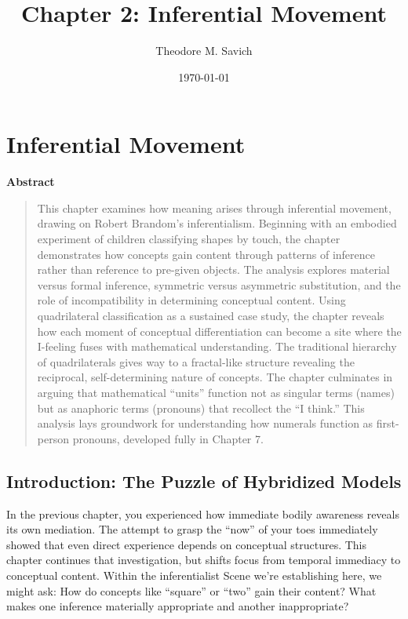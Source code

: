 \documentclass[12pt]{book}
\title{Chapter 2: Inferential Movement}
\author{Theodore M. Savich}
\date{\today}
\newenvironment{abstract}
    { %
      \begin{center} %
        \textbf{Abstract} %
      \end{center}
      \vspace{\baselineskip} %
      \begin{quotation} %
      \small %
    }
    { %
      \end{quotation} %
      \bigskip %
    }
\begin{document}
\maketitle

\chapter{Inferential Movement}\label{inferential-movement}

\begin{abstract}
  

This chapter examines how meaning arises through inferential movement, drawing on Robert Brandom's inferentialism. Beginning with an embodied experiment of children classifying shapes by touch, the chapter demonstrates how concepts gain content through patterns of inference rather than reference to pre-given objects. The analysis explores material versus formal inference, symmetric versus asymmetric substitution, and the role of incompatibility in determining conceptual content. Using quadrilateral classification as a sustained case study, the chapter reveals how each moment of conceptual differentiation can become a site where the I-feeling fuses with mathematical understanding. The traditional hierarchy of quadrilaterals gives way to a fractal-like structure revealing the reciprocal, self-determining nature of concepts. The chapter culminates in arguing that mathematical ``units'' function not as singular terms (names) but as anaphoric terms (pronouns) that recollect the ``I think.'' This analysis lays groundwork for understanding how numerals function as first-person pronouns, developed fully in Chapter 7.

\end{abstract}


\section{Introduction: The Puzzle of Hybridized Models}\label{introduction-the-puzzle-of-hybridized-models}

In the previous chapter, you experienced how immediate bodily awareness reveals its own mediation. The attempt to grasp the ``now'' of your toes immediately showed that even direct experience depends on conceptual structures. This chapter continues that investigation, but shifts focus from temporal immediacy to conceptual content. Within the inferentialist Scene we're establishing here, we might ask: How do concepts like ``square'' or ``two'' gain their content? What makes one inference materially appropriate and another inappropriate?
\end{document}
